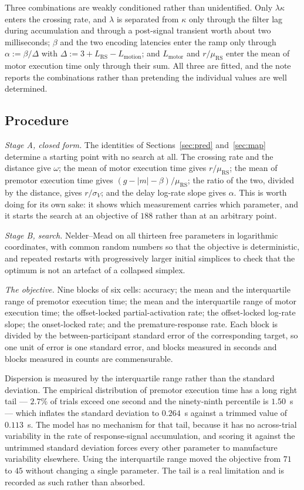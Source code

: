 \documentclass[a4paper,11pt]{article}
\newcommand{\NN}[1]{\textcolor{newcol}{#1}}
\newcommand{\1}{\mathbbm{1}}
\newcommand{\Lmot}{L_{\mathrm{motion}}}
\newcommand{\Lrs}{L_{\mathrm{RS}}}
\newcommand{\Lmo}{L_{\mathrm{motor}}}
\begin{document}
Three combinations are weakly conditioned rather than unidentified. Only
$\lambda\kappa$ enters the crossing rate, and $\lambda$ is separated from
$\kappa$ only through the filter lag during accumulation and through a
post-signal transient worth about two milliseconds; $\beta$ and the two encoding
latencies enter the ramp only through $\alpha:=\beta/\Delta$ with
$\Delta:=3+\Lrs-\Lmot$; and $\Lmo$ and $r/\mu_{\mathrm{RS}}$ enter the mean of motor
execution time only through their sum. All three are fitted, and the note reports the
combinations rather than pretending the individual values are well determined.

\subsection{Procedure}

\emph{Stage A, closed form.} The identities of Sections~\ref{sec:pred}
and~\ref{sec:map} determine a starting point with no search at all. The crossing rate
and the distance give $\omega$; the mean of motor execution time gives
$r/\mu_{\mathrm{RS}}$; the mean of premotor execution time gives
$(g-|m|-\beta)/\mu_{\mathrm{RS}}$; the ratio of the two, divided by the distance, gives
$r/\sigma_V$; and the delay log-rate slope gives $\alpha$. This is worth
doing for its own sake: it shows which measurement carries which parameter, and it
starts the search at an objective of $188$ rather than at an arbitrary point.

\emph{Stage B, search.} Nelder--Mead on all thirteen free parameters in logarithmic
coordinates, with common random numbers so that the objective is deterministic, and
repeated restarts with progressively larger initial simplices to check that the optimum
is not an artefact of a collapsed simplex.

\emph{The objective.} Nine blocks of six cells: accuracy; the mean and the interquartile
range of premotor execution time; the mean and the interquartile range of motor
execution time; the offset-locked partial-activation rate; the offset-locked log-rate
slope; the onset-locked rate; and the premature-response rate. Each block is divided
by the between-participant standard error of the corresponding target, so one unit of
error is one standard error, and blocks measured in seconds and blocks measured in
counts are commensurable.

\NN{Dispersion is measured by the interquartile range rather than the standard
deviation.} The empirical distribution of premotor execution time has a long right tail
--- $2.7\%$ of trials exceed one second and the ninety-ninth percentile is $1.50$~s ---
which inflates the standard deviation to $0.264$~s against a trimmed value of $0.113$~s.
The model has no mechanism for that tail, because it has no across-trial variability in
the rate of response-signal accumulation, and scoring it against the untrimmed standard
deviation forces every other parameter to manufacture variability elsewhere. Using the
interquartile range moved the objective from $71$ to $45$ without changing a single
parameter. The tail is a real limitation and is recorded as such rather than absorbed.
\end{document}
